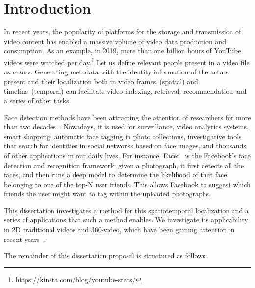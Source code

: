 \section{Introduction}

In recent years, the popularity of platforms for the storage and transmission of video content has enabled a massive volume of video data production and consumption.
As an example, in 2019, more than one billion hours of YouTube videos were watched per day.\footnote{https://kinsta.com/blog/youtube-stats/}
Let us define relevant people present in a video file as \emph{actors}.
Generating metadata with the identity information of the actors present and their localization both in video frames~(spatial) and timeline~(temporal) can facilitate video indexing, retrieval, recommendation and a series of other tasks.

Face detection methods have been attracting the attention of researchers for more than two decades~\cite{survey66}. 
Nowadays, it is used for surveillance, video analytics systems, smart shopping, automatic face tagging in photo collections, investigative tools that search for identities in social networks based on face images, and thousands of other applications in our daily lives.
For instance, Facer~\cite{hazelwood2018applied} is the Facebook's face detection and recognition framework; given a photograph, it first detects all the faces, and then runs a deep model to determine the likelihood of that face belonging to one of the top-N user friends.
This allows Facebook to suggest which friends the user might want to tag within the uploaded photographs. 


This dissertation investigates a method for this spatiotemporal localization and a series of applications that such a method enables. We investigate its applicability in 2D traditional videos and 360-video, which have been gaining attention in recent years~\cite{mendes2020authoring}.

The remainder of this dissertation proposal is structured as follows.


